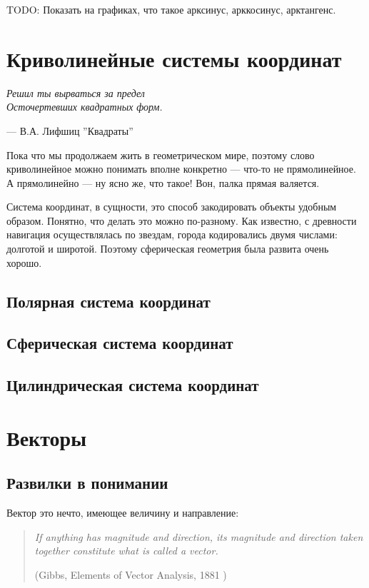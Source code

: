 \documentclass[a4paper,12pt]{article}
\newcounter{th-counter}
\begin{document}
TODO: Показать на графиках, что такое арксинус, арккосинус, арктангенс.

\section*{Криволинейные системы координат}
\epigraph{\textit{Решил ты вырваться за предел \\
Осточертевших квадратных форм.}}{— В.А. Лифшиц ''Квадраты''}

Пока что мы продолжаем жить в геометрическом мире, поэтому слово криволинейное можно понимать вполне конкретно --- что-то не прямолинейное. А прямолинейно --- ну ясно же, что такое! Вон, палка прямая валяется.

Система координат, в сущности, это способ закодировать объекты удобным образом. Понятно, что делать это можно по-разному. Как известно, с древности навигация осуществлялась по звездам, города кодировались двумя числами: долготой и широтой. Поэтому сферическая геометрия была развита очень хорошо.

\subsection*{Полярная система координат}

\subsection*{Сферическая система координат}

\subsection*{Цилиндрическая система координат}


\section*{Векторы}
\subsection*{Развилки в понимании}
Вектор это нечто, имеющее величину и направление:
\begin{quote}
\itshape
If anything has magnitude and direction, its magnitude and direction taken together constitute what is called a vector. 

(Gibbs, Elements of Vector Analysis, 1881 \cite{GibbsVectorAnalysis})
\end{quote}
\end{document}
